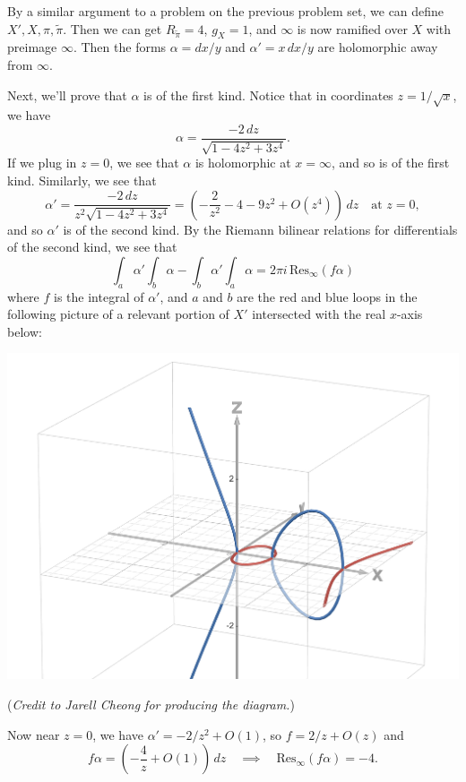 \documentclass[expanded]{lkx_pset}
\begin{document}
By a similar argument to a problem on the previous problem set, we can define $X', X, \pi, \widetilde{\pi}$. Then we can get $R_{\widetilde{\pi}}=4$, $g_X=1$, and $\infty$ is now ramified over $X$ with preimage $\infty$. Then the forms $\alpha = dx/y$ and $\alpha'=x\,dx/y$ are holomorphic away from $\infty$.

Next, we'll prove that $\alpha$ is of the first kind. Notice that in coordinates $z=1/\sqrt{x}$, we have
\[
	\alpha = \frac{-2\,dz}{\sqrt{1-4z^2+3z^4}}.
\]
If we plug in $z=0$, we see that $\alpha$ is holomorphic at $x=\infty$, and so is of the first kind. Similarly, we see that
\[
	\alpha' = \frac{-2\,dz}{z^2\sqrt{1-4z^2+3z^4}} = \left(-\frac{2}{z^2}-4-9z^2+O(z^4)\right)\,dz\quad\textrm{at } z=0,
\]
and so $\alpha'$ is of the second kind. By the Riemann bilinear relations for differentials of the second kind, we see that
\[
	\int_a \alpha' \int_b \alpha - \int_b \alpha' \int_a \alpha = 2\pi i\,\textrm{Res}_\infty(f\alpha)
\]
where $f$ is the integral of $\alpha'$, and $a$ and $b$ are the red and blue loops in the following picture of a relevant portion of $X'$ intersected with the real $x$-axis below:

\begin{center}
	\includegraphics[scale=0.5]{10.2.png}

	(\emph{Credit to Jarell Cheong for producing the diagram.})
\end{center}

Now near $z=0$, we have $\alpha' = -2/z^2+O(1)$, so $f=2/z+O(z)$ and
\[
	f\alpha = \left(-\frac{4}{z}+ O(1)\right)\,dz \quad\implies\quad \textrm{Res}_\infty(f\alpha)=-4.
\]
\end{document}
